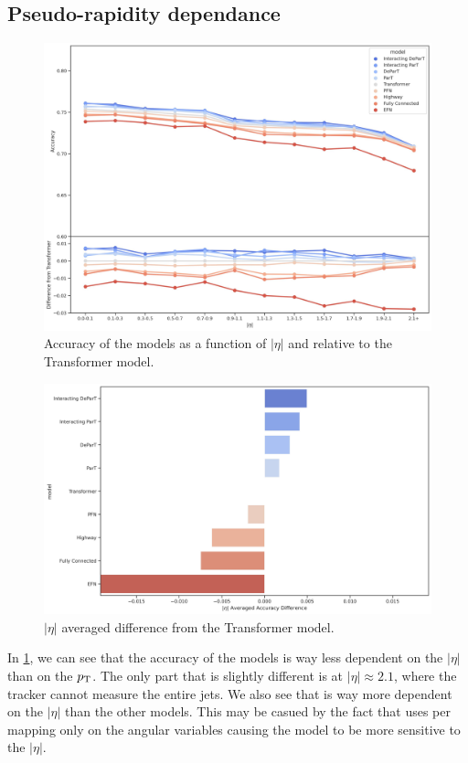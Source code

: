 \FloatBarrier

\subsection{Pseudo-rapidity dependance}
\label{sec:eta_dependance}
\begin{figure}[htb]
    \centering
    \includegraphics[width=1\linewidth]{src/plots/results/eta_dep/relative_accuracy.jpg}
    \caption{Accuracy of the models as a function of $|\eta|$ and relative to the Transformer model.}
    \label{fig:eta_dep_acc}
\end{figure}
\begin{figure}[htb]
    \centering
    \includegraphics[width=1\linewidth]{src/plots/results/eta_dep/relative_error.jpg}
    \caption{$|\eta|$ averaged difference from the Transformer model.}
    \label{fig:eta_dep_diff}
\end{figure}
In \cref{fig:eta_dep_acc}, we can see that the accuracy of the models is way less dependent on the $|\eta|$ than on the $p_\text{T}$.
The only part that is slightly different is at $|\eta| \approx 2.1$, where the tracker cannot measure the entire jets.
We also see that \EFN is way more dependent on the $|\eta|$ than the other models.
This may be casued by the fact that \EFN uses per \PFO mapping only on the angular variables causing the model to be more sensitive to the $|\eta|$.


